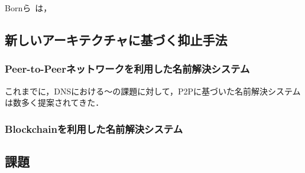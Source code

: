 Bornら~\cite{born}は，

\subsection{新しいアーキテクチャに基づく抑止手法}
\subsubsection{Peer-to-Peerネットワークを利用した名前解決システム}
これまでに，DNSにおける〜の課題に対して，P2Pに基づいた名前解決システムは数多く提案されてきた．
\subsubsection{Blockchainを利用した名前解決システム}
\subsection{課題}
\label{sec:issue-past-works}
